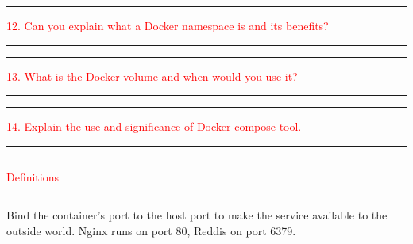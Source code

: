 \documentclass{article}
\begin{document}
\noindent
{\color{red} \rule{\linewidth}{0.5mm}}
\textcolor{red}{12. Can you explain what a Docker namespace is and its benefits?} \\
\noindent
{\color{red} \rule{\linewidth}{0.5mm}}


\noindent
{\color{red} \rule{\linewidth}{0.5mm}}
\textcolor{red}{13. What is the Docker volume and when would you use it?} \\
\noindent
{\color{red} \rule{\linewidth}{0.5mm}}


\noindent
{\color{red} \rule{\linewidth}{0.5mm}}
\textcolor{red}{14. Explain the use and significance of Docker-compose tool.} \\
\noindent
{\color{red} \rule{\linewidth}{0.5mm}}

\noindent
{\color{red} \rule{\linewidth}{0.5mm}}
\textcolor{red}{Definitions} \\
\noindent
{\color{red} \rule{\linewidth}{0.5mm}}

\begin{tcolorbox}[colback=red!5!white, colframe=red!50!black,title=Port Binding:] Bind the container's port to the host port to make the service available to the outside world. Nginx runs on port 80, Reddis on port 6379. 
\end{tcolorbox}
\end{document}
